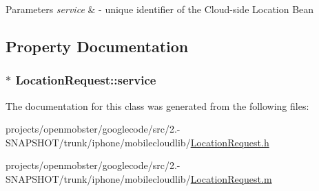 \begin{DoxyParams}{\-Parameters}
{\em service} & -\/ unique identifier of the \-Cloud-\/side \-Location \-Bean \\
\hline
\end{DoxyParams}


\subsection{\-Property \-Documentation}
\hypertarget{interface_location_request_a4a555e19ba8436ba0815b37581fadc28}{
\subsubsection[{service}]{ $\ast$ \-Location\-Request\-::service}}
\label{interface_location_request_a4a555e19ba8436ba0815b37581fadc28}


\-The documentation for this class was generated from the following files\-:\begin{DoxyCompactItemize}
\item 
projects/openmobster/googlecode/src/2.-\/\-S\-N\-A\-P\-S\-H\-O\-T/trunk/iphone/mobilecloudlib/\hyperlink{_location_request_8h}{\-Location\-Request.\-h}\item 
projects/openmobster/googlecode/src/2.-\/\-S\-N\-A\-P\-S\-H\-O\-T/trunk/iphone/mobilecloudlib/\hyperlink{_location_request_8m}{\-Location\-Request.\-m}\end{DoxyCompactItemize}
